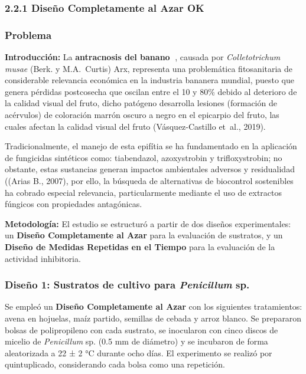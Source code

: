 \documentclass[
  spanish,
  letterpaper,
  DIV=11,
  numbers=noendperiod]{scrreprt}
\begin{document}
\subsubsection{2.2.1 Diseño Completamente al Azar
OK}\label{diseuxf1o-completamente-al-azar-ok}

\subsubsection{Problema}\label{problema}

\textbf{Introducción:} La \textbf{antracnosis del banano} 🍌, causada
por \emph{Colletotrichum musae} (Berk. y M.A.~Curtis) Arx, representa
una problemática fitosanitaria de considerable relevancia económica en
la industria bananera mundial, puesto que genera pérdidas postcosecha
que oscilan entre el 10 y 80\% debido al deterioro de la calidad visual
del fruto, dicho patógeno desarrolla lesiones (formación de acérvulos)
de coloración marrón oscuro a negro en el epicarpio del fruto, las
cuales afectan la calidad visual del fruto (Vásquez-Castillo et~al.,
2019).

Tradicionalmente, el manejo de esta epifítia se ha fundamentado en la
aplicación de fungicidas sintéticos como: tiabendazol, azoxystrobin y
trifloxystrobin; no obstante, estas sustancias generan impactos
ambientales adversos y residualidad ((Arias B., 2007), por ello, la
búsqueda de alternativas de biocontrol sostenibles ha cobrado especial
relevancia, particularmente mediante el uso de extractos fúngicos con
propiedades antagónicas.

\textbf{Metodología:} El estudio se estructuró a partir de dos diseños
experimentales: un \textbf{Diseño Completamente al Azar} para la
evaluación de sustratos, y un \textbf{Diseño de Medidas Repetidas en el
Tiempo} para la evaluación de la actividad inhibitoria.

\subsubsection{\texorpdfstring{Diseño 1: Sustratos de cultivo para
\emph{Penicillum}
sp.}{Diseño 1: Sustratos de cultivo para Penicillum sp.}}\label{diseuxf1o-1-sustratos-de-cultivo-para-penicillum-sp.}

Se empleó un \textbf{Diseño Completamente al Azar} con los siguientes
tratamientos: avena en hojuelas, maíz partido, semillas de cebada y
arroz blanco. Se prepararon bolsas de polipropileno con cada sustrato,
se inocularon con cinco discos de micelio de \emph{Penicillum} sp. (0.5
mm de diámetro) y se incubaron de forma aleatorizada a 22 ± 2 °C durante
ocho días. El experimento se realizó por quintuplicado, considerando
cada bolsa como una repetición.
\end{document}
